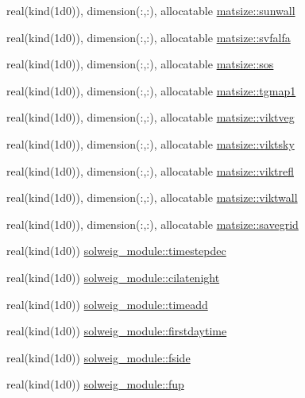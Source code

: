 \begin{DoxyCompactItemize}
\item 
real(kind(1d0)), dimension(\+:,\+:), allocatable \hyperlink{namespacematsize_acb0719b5e8d656e7faaac0470f8b9008}{matsize\+::sunwall}
\item 
real(kind(1d0)), dimension(\+:,\+:), allocatable \hyperlink{namespacematsize_a8fd9348664bd661da87ca40af12bed50}{matsize\+::svfalfa}
\item 
real(kind(1d0)), dimension(\+:,\+:), allocatable \hyperlink{namespacematsize_a1449eeb1e7360b8c66d2b3d039acf99b}{matsize\+::sos}
\item 
real(kind(1d0)), dimension(\+:,\+:), allocatable \hyperlink{namespacematsize_a86f180bc19d9a733d20cd41559fc9c15}{matsize\+::tgmap1}
\item 
real(kind(1d0)), dimension(\+:,\+:), allocatable \hyperlink{namespacematsize_ad54fb3efcdbb5a40c1d00fb2795c4482}{matsize\+::viktveg}
\item 
real(kind(1d0)), dimension(\+:,\+:), allocatable \hyperlink{namespacematsize_a0e44ed5f655a5ed08b631369eee6d6e6}{matsize\+::viktsky}
\item 
real(kind(1d0)), dimension(\+:,\+:), allocatable \hyperlink{namespacematsize_ab651f44e70ead8097cd71733bf545246}{matsize\+::viktrefl}
\item 
real(kind(1d0)), dimension(\+:,\+:), allocatable \hyperlink{namespacematsize_a2268200b373b89fec089619c8f9d777e}{matsize\+::viktwall}
\item 
real(kind(1d0)), dimension(\+:,\+:), allocatable \hyperlink{namespacematsize_a955b428c1737be712b663eeca12e7446}{matsize\+::savegrid}
\item 
real(kind(1d0)) \hyperlink{namespacesolweig__module_a322c7874b1f125d732948c1ea203d2e3}{solweig\+\_\+module\+::timestepdec}
\item 
real(kind(1d0)) \hyperlink{namespacesolweig__module_a4339bc64ae33d2ff852f5281224a4954}{solweig\+\_\+module\+::cilatenight}
\item 
real(kind(1d0)) \hyperlink{namespacesolweig__module_a0e622f7be5cb292d0a8df052b0810910}{solweig\+\_\+module\+::timeadd}
\item 
real(kind(1d0)) \hyperlink{namespacesolweig__module_a55653ebd3344c1899b9d5ab2b9975142}{solweig\+\_\+module\+::firstdaytime}
\item 
real(kind(1d0)) \hyperlink{namespacesolweig__module_a1ad38870ebe29d6487113345dd9f16ae}{solweig\+\_\+module\+::fside}
\item 
real(kind(1d0)) \hyperlink{namespacesolweig__module_a432f39e2ce08b7a5a5ae823cd0b1b3f9}{solweig\+\_\+module\+::fup}

\end{DoxyCompactItemize}

